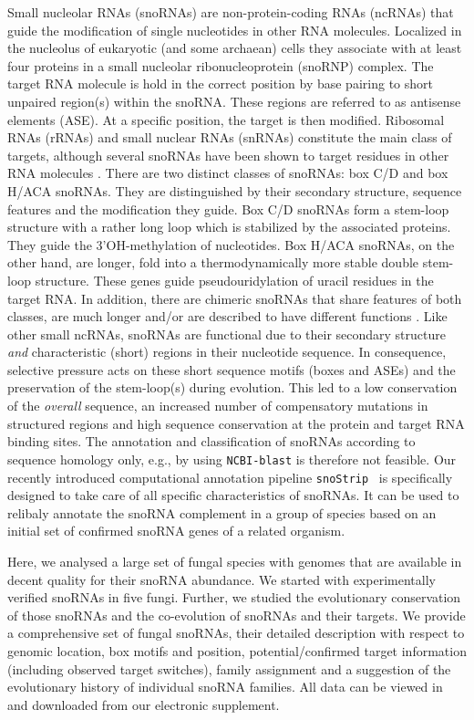 \documentclass[preprint,3p,times,twocolumn]{elsarticle}
\newcommand{\snostrip}{\texttt{snoStrip}}
\begin{document}
Small nucleolar RNAs (snoRNAs) are non-protein-coding RNAs (ncRNAs)
that guide the modification of single nucleotides in other RNA
molecules.  Localized in the nucleolus of eukaryotic (and some
archaean) cells they associate with at least four proteins in a small
nucleolar ribonucleoprotein (snoRNP) complex.  The target RNA molecule
is hold in the correct position by base pairing to short unpaired
region(s) within the snoRNA.  These regions are referred to as
antisense elements (ASE).  At a specific position, the target is then
modified.  Ribosomal RNAs (rRNAs) and small nuclear RNAs (snRNAs)
constitute the main class of targets, although several snoRNAs have
been shown to target residues in other RNA molecules
\cite{Clouet_d'Orval:2001, Dennis:2001, Uliel:2004, Cavaillé:2000,
  Kishore:2006, Kiss:2002, Matera:2007, Bratkovi:2011}.  There are two
distinct classes of snoRNAs: box C/D and box H/ACA snoRNAs.  They are
distinguished by their secondary structure, sequence features and the
modification they guide.  Box C/D snoRNAs form a stem-loop structure
with a rather long loop which is stabilized by the associated
proteins.  They guide the 3'OH-methylation of nucleotides.  Box H/ACA
snoRNAs, on the other hand, are longer, fold into a thermodynamically
more stable double stem-loop structure.  These genes guide
pseudouridylation of uracil residues in the target RNA.  In addition,
there are chimeric snoRNAs that share features of both classes, are
much longer and/or are described to have different functions
\cite{Darzacq:2002}.  Like other small ncRNAs, snoRNAs are functional
due to their secondary structure \emph{and} characteristic (short)
regions in their nucleotide sequence.  In consequence, selective
pressure acts on these short sequence motifs (boxes and ASEs) and the
preservation of the stem-loop(s) during evolution.  This led to a low
conservation of the \emph{overall} sequence, an increased number of
compensatory mutations in structured regions and high sequence
conservation at the protein and target RNA binding sites.  The
annotation and classification of snoRNAs according to sequence
homology only, e.g., by using \texttt{NCBI-blast} \cite{Altschul:1990}
is therefore not feasible.  Our recently introduced computational
annotation pipeline \snostrip\ \cite{Bartschat:2014} is specifically
designed to take care of all specific characteristics of snoRNAs.  It
can be used to relibaly annotate the snoRNA complement in a group of
species based on an initial set of confirmed snoRNA genes of a related
organism.

Here, we analysed a large set of fungal species with genomes that are
available in decent quality for their snoRNA abundance.  We started
with experimentally verified snoRNAs in five fungi.  Further, we
studied the evolutionary conservation of those snoRNAs and the
co-evolution of snoRNAs and their targets. We provide a comprehensive
set of fungal snoRNAs, their detailed description with respect to
genomic location, box motifs and position, potential/confirmed target
information (including observed target switches), family assignment
and a suggestion of the evolutionary history of individual snoRNA
families.  All data can be viewed in and downloaded from our
electronic supplement.
\end{document}
